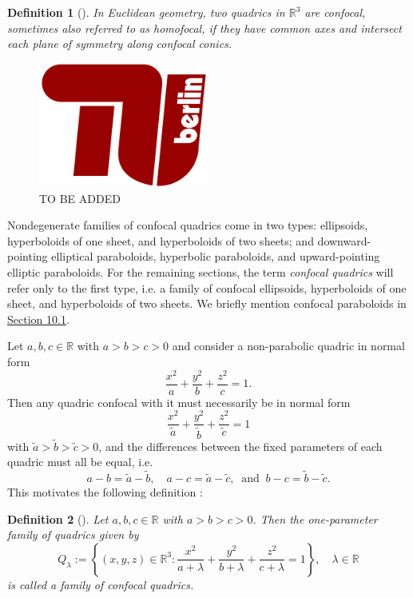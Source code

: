 \documentclass[10pt, a4paper]{article}
\theoremstyle{BoldTopSpacing}
\theoremstyle{BoldTopSpacing}
\theoremstyle{BoldTopSpacing}
\theoremstyle{BoldTopBottomSpacing}
\newtheorem{definition}{Definition}[section]
\theoremstyle{BoldTopSpacing}
\theoremstyle{BoldTopBottomSpacing}
\theoremstyle{remark}
\begin{document}
\begin{definition}[]
\label{def:confocal-quadrics}
In Euclidean geometry, two quadrics in $\mathbb{R}^3$ are \textit{confocal}, sometimes also referred to as \textit{homofocal}, if they have common axes and intersect each plane of symmetry along confocal conics.
\end{definition}

\begin{figure}[H]
    \centering
    \includegraphics[width=0.5\textwidth]{TU-Berlin-Logo.png}
    \caption{TO BE ADDED}
    \label{fig:figgg}
\end{figure}

Nondegenerate families of confocal quadrics come in two types: ellipsoids, hyperboloids of one sheet, and hyperboloids of two sheets; and downward-pointing elliptical paraboloids, hyperbolic paraboloids, and upward-pointing elliptic paraboloids. For the remaining sections, the term \textit{confocal quadrics} will refer only to the first type, i.e. a family of confocal ellipsoids, hyperboloids of one sheet, and hyperboloids of two sheets. We briefly mention confocal paraboloids in \hyperref[subsec:confocal-paraboloids]{Section 10.1}.\par

Let $a, b, c \in \mathbb{R}$ with $a > b > c > 0$ and consider a non-parabolic quadric in normal form
\[
    \frac{x^2}{a} + \frac{y^2}{b} + \frac{z^2}{c} = 1.
\]
Then any quadric confocal with it must necessarily be in normal form
\[
    \frac{x^2}{\tilde{a}} + \frac{y^2}{\tilde{b}} + \frac{z^2}{\tilde{c}} = 1
\]
with $\tilde{a} > \tilde{b} > \tilde{c} > 0$, and the differences between the fixed parameters of each quadric must all be equal, i.e.
\[
    a - b = \tilde{a} - \tilde{b}, \quad a - c = \tilde{a} - \tilde{c}, \ \text{ and } \  b - c = \tilde{b} - \tilde{c}.
\]
This motivates the following definition \cite{geometryIII}:

\begin{definition}[]
\label{def:family-of-confocal-quadrics}
Let $a, b, c \in \mathbb{R}$ with $a > b > c > 0$. Then the one-parameter family of quadrics given by
\[
    Q_{\lambda} := \left\{ (x, y, z) \in \mathbb{R}^3 : \frac{x^2}{a + \lambda} + \frac{y^2}{b + \lambda} + \frac{z^2}{c + \lambda} = 1 \right\}, \quad \lambda \in \mathbb{R}
\]
is called a family of confocal quadrics.
\end{definition}
\end{document}
